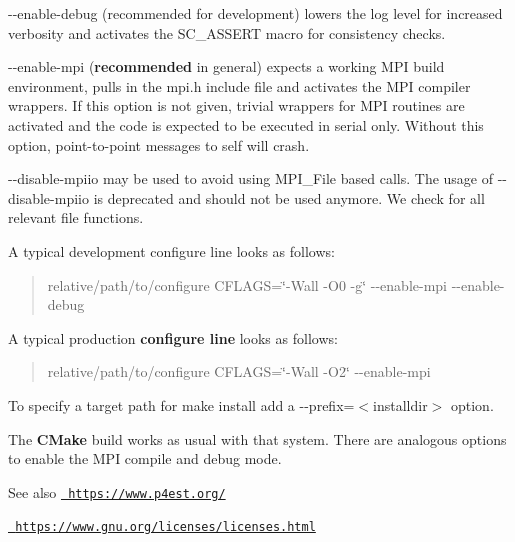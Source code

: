 \begin{DoxyItemize}
\item {\ttfamily -\/-\/enable-\/debug} (recommended for development) lowers the log level for increased verbosity and activates the {\ttfamily SC\+\_\+\+ASSERT} macro for consistency checks.
\item {\ttfamily -\/-\/enable-\/mpi} ({\bfseries{recommended}} in general) expects a working MPI build environment, pulls in the mpi.\+h include file and activates the MPI compiler wrappers. If this option is not given, trivial wrappers for MPI routines are activated and the code is expected to be executed in serial only. Without this option, point-\/to-\/point messages to self will crash.
\item {\ttfamily -\/-\/disable-\/mpiio} may be used to avoid using {\ttfamily MPI\+\_\+\+File} based calls. The usage of {\ttfamily -\/-\/disable-\/mpiio} is deprecated and should not be used anymore. We check for all relevant file functions.
\end{DoxyItemize}

A typical development configure line looks as follows\+: \begin{quote}
{\ttfamily relative/path/to/configure CFLAGS=\char`\"{}-\/\+Wall -\/\+O0 -\/g\char`\"{} -\/-\/enable-\/mpi -\/-\/enable-\/debug} \end{quote}
A typical production {\bfseries{configure line}} looks as follows\+: \begin{quote}
{\ttfamily relative/path/to/configure CFLAGS=\char`\"{}-\/\+Wall -\/\+O2\char`\"{} -\/-\/enable-\/mpi} \end{quote}
To specify a target path for {\ttfamily make install} add a {\ttfamily -\/-\/prefix=$<$installdir$>$} option.

The {\bfseries{CMake}} build works as usual with that system. There are analogous options to enable the MPI compile and debug mode.

\begin{DoxySeeAlso}{See also}
\href{https://www.p4est.org/}{\texttt{ https\+://www.\+p4est.\+org/}} 

\href{https://www.gnu.org/licenses/licenses.html}{\texttt{ https\+://www.\+gnu.\+org/licenses/licenses.\+html}} 
\end{DoxySeeAlso}

